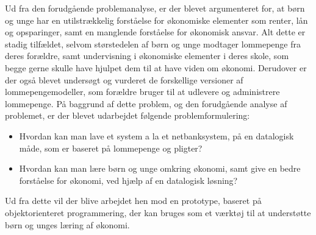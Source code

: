 Ud fra den forudgående problemanalyse, er der blevet argumenteret for, at børn og unge har en utilstrækkelig forståelse for økonomiske elementer som renter, lån og opsparinger, samt en manglende forståelse for økonomisk ansvar. Alt dette er stadig tilfældet, selvom størstedelen af børn og unge modtager lommepenge fra deres forældre, samt undervisning i økonomiske elementer i deres skole, som begge gerne skulle have hjulpet dem til at have viden om økonomi. Derudover er der også blevet undersøgt og vurderet de forskellige versioner af lommepengemodeller, som forældre bruger til at udlevere og administrere lommepenge. På baggrund af dette problem, og den forudgående analyse af problemet, er der blevet udarbejdet følgende problemformulering:

\begin{itemize}

	\item Hvordan kan man lave et system a la et netbanksystem, på en datalogisk måde, som er baseret på lommepenge og pligter?
	\item Hvordan kan man lære børn og unge omkring økonomi, samt give en bedre forståelse for økonomi, ved hjælp af en datalogisk løsning?

\end{itemize}

Ud fra dette vil der blive arbejdet hen mod en prototype, baseret på objektorienteret programmering, der kan bruges som et værktøj til at understøtte børn og unges læring af økonomi.